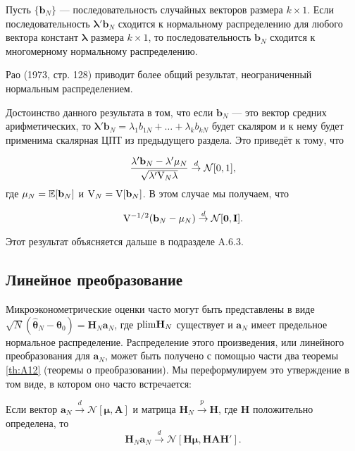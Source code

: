 \begin{theorem}
Пусть $\{\mathbf{b}_N\}$ --- последовательность случайных векторов размера $k\times 1$. Если последовательность $\mathbf{\lambda}'\mathbf{b}_N$ сходится к нормальному распределению для любого вектора констант $\mathbf{\lambda}$ размера $k\times 1$, то последовательность $\mathbf{b}_N$ сходится к многомерному нормальному распределению.
\end{theorem}

Рао (1973, стр. 128) приводит более общий результат, неограниченный нормальным распределением.

Достоинство данного результата в том, что если $\mathbf{b}_N$ --- это вектор средних арифметических, то $\mathbf{\lambda}'\mathbf{b}_N=\lambda_1 b_{1N}+\ldots + \lambda_k b_{kN}$ будет скаляром и к нему будет применима скалярная ЦПТ из предыдущего раздела. Это приведёт к тому, что

\[
\frac{\mathbf{\lambda}'\mathbf{b}_N-\mathbf{\lambda}'\mathbf{\mu}_N}
{\sqrt{\mathbf{\lambda}'\mathbf{\mathrm{V}}_N \mathbf{\lambda}}} \overset{d}{\to} \mathcal{N}[0,1],
\]
где $\mathbf{\mu}_N=\mathbb{E}[\mathbf{b}_N]$ и $\mathbf{\mathrm{V}}_N=\mathrm{V}[\mathbf{b}_N]$. В этом случае мы получаем, что

\begin{equation}
\label{eq:A14}
\mathbf{\mathrm{V}}^{-1/2}(\mathbf{b}_N-\mathbf{\mu}_N)\overset{d}{\to}
\mathcal{N}[\mathbf{0},\mathbf{I}].	
\end{equation}

Этот результат объясняется дальше в подразделе A.6.3.

\subsection{Линейное преобразование}

Микроэконометрические оценки часто могут быть представлены в виде $\sqrt{N}(\hat{\mathbf{\theta}}_N-\mathbf{\theta}_0)=\mathbf{H}_N\mathbf{a}_N$, где $\mathrm{plim } \mathbf{H}_N$ существует и $\mathbf{a}_N$ имеет предельное нормальное распределение. Распределение этого произведения, или линейного преобразования для $\mathbf{a}_N$, может быть получено с помощью части два теоремы \ref{th:A12} (теоремы о преобразовании). Мы переформулируем это утверждение в том виде, в котором оно часто встречается:

\begin{theorem}
\label{th:A17}
Если вектор $\mathbf{a}_N \overset{d}{\to} \mathcal{N}[\mathbf{\mu},\mathbf{A}]$ и матрица $\mathbf{H}_N\overset{p}{\to} \mathbf{H}$, где $\mathbf{H}$ положительно определена, то
\begin{equation}
\label{eq:A15}
\mathbf{H}_N\mathbf{a}_N \overset{d}{\to} \mathcal{N}
[\mathbf{H}\mathbf{\mu},\mathbf{H}\mathbf{A}\mathbf{H}'].
\end{equation}
\end{theorem}

